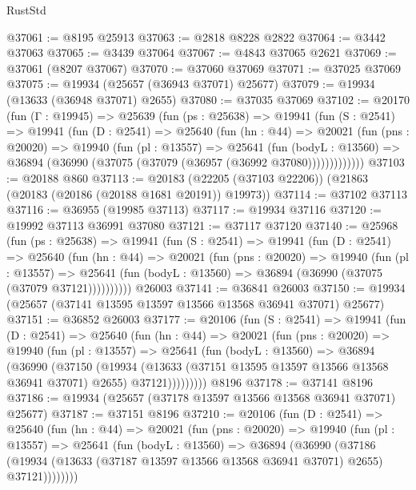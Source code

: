 \begin{lexlean}{RustStd}
\begin{coremodule}
@37061 := @8195 @25913
@37063 := @2818 @8228 @2822
@37064 := @3442 @37063
@37065 := @3439 @37064
@37067 := @4843 @37065 @2621
@37069 := @37061 (@8207 @37067)
@37070 := @37060 @37069
@37071 := @37025 @37069
@37075 := @19934 (@25657 (@36943 @37071) @25677)
@37079 := @19934 (@13633 (@36948 @37071) @2655)
@37080 := @37035 @37069
@37102 := @20170
    (fun (Γ : @19945) =>
    @25639
      (fun (ps : @25638) =>
      @19941
        (fun (S : @2541) =>
        @19941
          (fun (D : @2541) =>
          @25640
            (fun (hn : @44) =>
            @20021
              (fun (pns : @20020) =>
              @19940
                (fun (pl : @13557) =>
                @25641
                  (fun (bodyL : @13560) =>
                  @36894 (@36990 (@37075 (@37079 (@36957 (@36992 @37080)))))))))))))
@37103 := @20188 @860
@37113 := @20183 (@22205 (@37103 @22206)) (@21863 (@20183 (@20186 (@20188 @1681 @20191)) @19973))
@37114 := @37102 @37113
@37116 := @36955 (@19985 @37113)
@37117 := @19934 @37116
@37120 := @19992 @37113 @36991 @37080
@37121 := @37117 @37120
@37140 := @25968
    (fun (ps : @25638) =>
    @19941
      (fun (S : @2541) =>
      @19941
        (fun (D : @2541) =>
        @25640
          (fun (hn : @44) =>
          @20021
            (fun (pns : @20020) =>
            @19940
              (fun (pl : @13557) =>
              @25641 (fun (bodyL : @13560) => @36894 (@36990 (@37075 (@37079 @37121))))))))))
    @26003
@37141 := @36841 @26003
@37150 := @19934 (@25657 (@37141 @13595 @13597 @13566 @13568 @36941 @37071) @25677)
@37151 := @36852 @26003
@37177 := @20106
    (fun (S : @2541) =>
    @19941
      (fun (D : @2541) =>
      @25640
        (fun (hn : @44) =>
        @20021
          (fun (pns : @20020) =>
          @19940
            (fun (pl : @13557) =>
            @25641
              (fun (bodyL : @13560) =>
              @36894
                (@36990
                  (@37150
                    (@19934
                      (@13633 (@37151 @13595 @13597 @13566 @13568 @36941 @37071) @2655)
                      @37121)))))))))
    @8196
@37178 := @37141 @8196
@37186 := @19934 (@25657 (@37178 @13597 @13566 @13568 @36941 @37071) @25677)
@37187 := @37151 @8196
@37210 := @20106
    (fun (D : @2541) =>
    @25640
      (fun (hn : @44) =>
      @20021
        (fun (pns : @20020) =>
        @19940
          (fun (pl : @13557) =>
          @25641
            (fun (bodyL : @13560) =>
            @36894
              (@36990
                (@37186
                  (@19934 (@13633 (@37187 @13597 @13566 @13568 @36941 @37071) @2655) @37121))))))))

\end{coremodule}
\end{lexlean}
